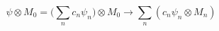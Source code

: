 \documentclass[20pt]{extreport}
\def\M0{ M_0 }
\begin{document}
$$\displaystyle \psi  \otimes \M0 = \big(\sum_n c_n\psi_n\big) \otimes \M0 \to  \sum_n (c_n \psi_n  \otimes M_n)
$$
\end{document}
